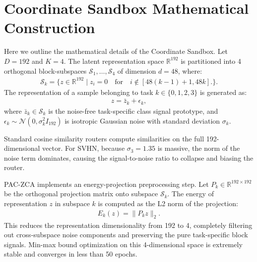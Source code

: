 \documentclass{article}
\theoremstyle{plain}
\theoremstyle{definition}
\theoremstyle{remark}
\begin{document}
\section{Coordinate Sandbox Mathematical Construction}
\label{app:sandbox}

Here we outline the mathematical details of the Coordinate Sandbox. Let $D=192$ and $K=4$. The latent representation space $\mathbb{R}^{192}$ is partitioned into 4 orthogonal block-subspaces $\mathcal{S}_1, \dots, \mathcal{S}_4$ of dimension $d = 48$, where:
\begin{align}
    \mathcal{S}_k = \{ z \in \mathbb{R}^{192} \mid z_i = 0 \quad \text{for} \quad i \notin [48(k-1)+1, 48k] \!. \}.
\end{align}
The representation of a sample belonging to task $k \in \{0, 1, 2, 3\}$ is generated as:
\begin{align}
    z = \bar{z}_k + \epsilon_k,
\end{align}
where $\bar{z}_k \in \mathcal{S}_k$ is the noise-free task-specific class signal prototype, and $\epsilon_k \sim \mathcal{N}(0, \sigma_k^2 I_{192})$ is isotropic Gaussian noise with standard deviation $\sigma_k$. 

Standard cosine similarity routers compute similarities on the full 192-dimensional vector. For SVHN, because $\sigma_3 = 1.35$ is massive, the norm of the noise term dominates, causing the signal-to-noise ratio to collapse and biasing the router. 

PAC-ZCA implements an energy-projection preprocessing step. Let $P_k \in \mathbb{R}^{192 \times 192}$ be the orthogonal projection matrix onto subspace $\mathcal{S}_k$. The energy of representation $z$ in subspace $k$ is computed as the L2 norm of the projection:
\begin{align}
    E_k(z) = \|P_k z\|_2.
\end{align}
This reduces the representation dimensionality from 192 to 4, completely filtering out cross-subspace noise components and preserving the pure task-specific block signals. Min-max bound optimization on this 4-dimensional space is extremely stable and converges in less than 50 epochs.
\end{document}
